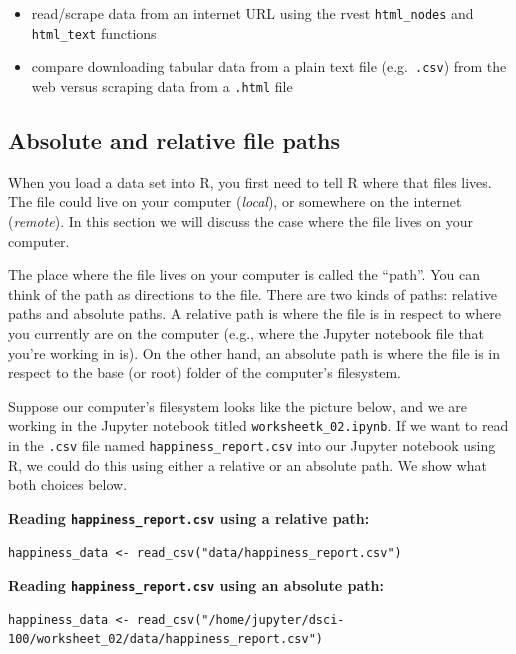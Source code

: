 \documentclass[
]{article}
\providecommand{\tightlist}{%
  \setlength{\itemsep}{0pt}\setlength{\parskip}{0pt}}
\begin{document}
\begin{itemize}
  \begin{itemize}
  \tightlist
  \item
    read/scrape data from an internet URL using the rvest
    \texttt{html\_nodes} and \texttt{html\_text} functions
  \item
    compare downloading tabular data from a plain text file
    (e.g.~\texttt{.csv}) from the web versus scraping data from a
    \texttt{.html} file
  \end{itemize}
\end{itemize}

\hypertarget{absolute-and-relative-file-paths}{%
\subsection{Absolute and relative file
paths}\label{absolute-and-relative-file-paths}}

When you load a data set into R, you first need to tell R where that
files lives. The file could live on your computer (\emph{local}), or
somewhere on the internet (\emph{remote}). In this section we will
discuss the case where the file lives on your computer.

The place where the file lives on your computer is called the ``path''.
You can think of the path as directions to the file. There are two kinds
of paths: relative paths and absolute paths. A relative path is where
the file is in respect to where you currently are on the computer (e.g.,
where the Jupyter notebook file that you're working in is). On the other
hand, an absolute path is where the file is in respect to the base (or
root) folder of the computer's filesystem.

Suppose our computer's filesystem looks like the picture below, and we
are working in the Jupyter notebook titled
\texttt{worksheetk\_02.ipynb}. If we want to read in the \texttt{.csv}
file named \texttt{happiness\_report.csv} into our Jupyter notebook
using R, we could do this using either a relative or an absolute path.
We show what both choices below.

\textbf{Reading \texttt{happiness\_report.csv} using a relative path:}

\begin{verbatim}
happiness_data <- read_csv("data/happiness_report.csv")
\end{verbatim}

\textbf{Reading \texttt{happiness\_report.csv} using an absolute path:}

\begin{verbatim}
happiness_data <- read_csv("/home/jupyter/dsci-100/worksheet_02/data/happiness_report.csv")
\end{verbatim}
\end{document}
